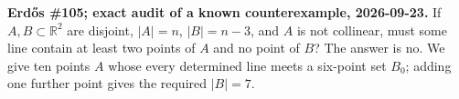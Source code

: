 \textbf{Erd\H{o}s \#105; exact audit of a known counterexample, 2026-09-23.}
If $A,B\subset\mathbb R^2$ are disjoint, $|A|=n$, $|B|=n-3$, and $A$ is not collinear, must some line contain at least two points of $A$ and no point of $B$? The answer is no. We give ten points $A$ whose every determined line meets a six-point set $B_0$; adding one further point gives the required $|B|=7$.
